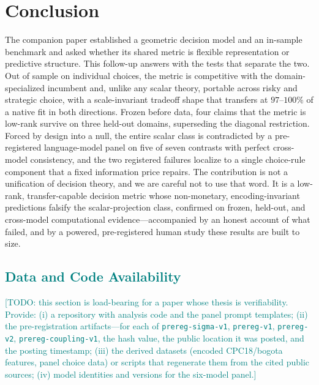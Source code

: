 \documentclass[journal]{IEEEtran}
\newcommand{\rev}[1]{\textcolor{teal}{#1}}
\begin{document}
\section{Conclusion}
\label{sec:conclusion}

The companion paper established a geometric decision model and an in-sample benchmark and asked whether its shared metric is flexible representation or predictive structure.
This follow-up answers with the tests that separate the two.
Out of sample on individual choices, the metric is competitive with the domain-specialized incumbent and, unlike any scalar theory, portable across risky and strategic choice, with a scale-invariant tradeoff shape that transfers at $97$--$100\%$ of a native fit in both directions.
Frozen before data, four claims that the metric is low-rank survive on three held-out domains, superseding the diagonal restriction.
Forced by design into a null, the entire scalar class is contradicted by a pre-registered language-model panel on five of seven contrasts with perfect cross-model consistency, and the two registered failures localize to a single choice-rule component that a fixed information price repairs.
The contribution is not a unification of decision theory, and we are careful not to use that word.
It is a low-rank, transfer-capable decision metric whose non-monetary, encoding-invariant predictions falsify the scalar-projection class, confirmed on frozen, held-out, and cross-model computational evidence---accompanied by an honest account of what failed, and by a powered, pre-registered human study these results are built to size.

\rev{%
\section*{Data and Code Availability}
[TODO: this section is load-bearing for a paper whose thesis is verifiability. Provide: (i) a repository with analysis code and the panel prompt templates; (ii) the pre-registration artifacts---for each of \texttt{prereg-sigma-v1}, \texttt{prereg-v1}, \texttt{prereg-v2}, \texttt{prereg-coupling-v1}, the hash value, the public location it was posted, and the posting timestamp; (iii) the derived datasets (encoded CPC18/bogota features, panel choice data) or scripts that regenerate them from the cited public sources; (iv) model identities and versions for the six-model panel.]
}%
\end{document}
